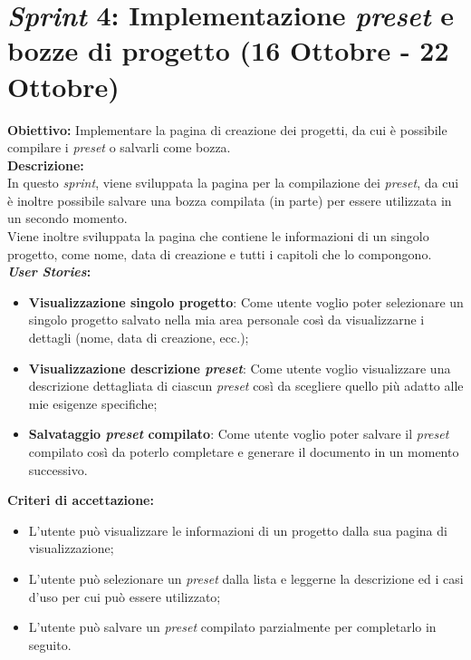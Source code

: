 \section*{\textit{Sprint} 4: Implementazione \textit{preset} e bozze di progetto (16 Ottobre - 22 Ottobre)}
\textbf{Obiettivo:} Implementare la pagina di creazione dei progetti, da cui è possibile compilare i \textit{preset} o salvarli come bozza.\\

\noindent \textbf{Descrizione:}\\
\noindent In questo \textit{sprint}, viene sviluppata la pagina per la compilazione dei \textit{preset}, da cui è inoltre possibile salvare una bozza compilata (in parte) per essere utilizzata in un secondo momento.\\
Viene inoltre sviluppata la pagina che contiene le informazioni di un singolo progetto, come nome, data di creazione e tutti i capitoli che lo compongono.\\  

\noindent \textbf{\textit{User Stories}:} 
\begin{itemize}
    \item \textbf{Visualizzazione singolo progetto}: Come utente voglio poter selezionare un singolo progetto salvato nella mia area personale così da visualizzarne i dettagli (nome, data di creazione, ecc.);
    \item \textbf{Visualizzazione descrizione \textit{preset}}: Come utente voglio visualizzare una descrizione dettagliata di ciascun \textit{preset} così da scegliere quello più adatto alle mie esigenze specifiche;
    \item \textbf{Salvataggio \textit{preset} compilato}: Come utente voglio poter salvare il \textit{preset} compilato così da poterlo completare e generare il documento in un momento successivo.
\end{itemize}

\noindent \textbf{Criteri di accettazione:}  
\begin{itemize}
    \item L’utente può visualizzare le informazioni di un progetto dalla sua pagina di visualizzazione;
    \item L'utente può selezionare un \textit{preset} dalla lista e leggerne la descrizione ed i casi d’uso per cui può essere utilizzato;
    \item L'utente può salvare un \textit{preset} compilato parzialmente per completarlo in seguito.
\end{itemize}

